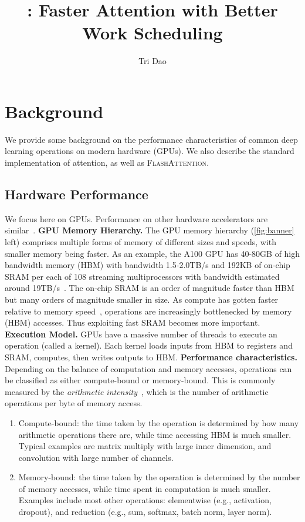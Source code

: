 \message{ !name(../flash2.tex)}\documentclass{article}
\title{\sysname: Faster Attention with Better Work Scheduling}
\author[$\dagger$]{Tri Dao}
\affil[$\dagger$]{Department of Computer Science, Princeton University}
\newcommand{\sysnameone}{\textsc{FlashAttention}\xspace}
\begin{document}
\section{Background}
\label{sec:background}
We provide some background on the performance characteristics of common deep
learning operations on modern hardware (GPUs).
We also describe the standard implementation of attention, as well as \sysnameone.
\subsection{Hardware Performance}
\label{subsec:hardware}
We focus here on GPUs.
Performance on other hardware accelerators are similar~\citep{jouppi2017datacenter, jia2019dissecting}.
\textbf{GPU Memory Hierarchy.}
The GPU memory hierarchy (\cref{fig:banner} left) comprises multiple forms of memory of different
sizes and speeds, with smaller memory being faster.
As an example, the A100 GPU has 40-80GB of high bandwidth memory (HBM) with
bandwidth 1.5-2.0TB/s and 192KB of on-chip SRAM per each of 108 streaming
multiprocessors with
bandwidth estimated around 19TB/s~\citep{jia2018dissecting, jia2021dissecting}.
The on-chip SRAM is an order of magnitude faster than HBM but many orders of
magnitude smaller in size.
As compute has gotten faster relative to memory speed~\citep{nvidia2017nvidia,nvidia2020nvidia,nvidia2022nvidia}, operations
are increasingly bottlenecked by memory (HBM) accesses.
Thus exploiting fast SRAM becomes more important.
\textbf{Execution Model.}
GPUs have a massive number of threads to execute an operation
(called a kernel).
Each kernel loads inputs from HBM to registers and SRAM, computes, then writes outputs to HBM.
\textbf{Performance characteristics.} Depending on the balance of computation and memory accesses, operations can be
classified as either compute-bound or memory-bound.
This is commonly measured by the \emph{arithmetic intensity}~\citep{williams2009roofline},
which is the number of arithmetic operations per byte of memory access.
\begin{enumerate}[itemsep=0.1pt,topsep=0pt,leftmargin=*]
  \item Compute-bound: the time taken by the operation is determined by how many
  arithmetic operations there are, while time accessing HBM
  is much smaller. Typical examples are matrix multiply with large inner
  dimension, and convolution with large number of channels.
  \item Memory-bound: the time taken by the operation is determined by the
  number of memory accesses, while time spent in computation is much smaller.
  Examples include most other operations:
  elementwise (e.g., activation, dropout), and reduction (e.g., sum,
  softmax, batch norm, layer norm).
\end{enumerate}
\end{document}
